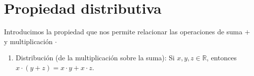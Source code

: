 \documentclass[11pt]{article}
\newcommand{\R}{\mathbb{R}}
\begin{document}
\section*{Propiedad distributiva}

Introducimos la propiedad que nos permite relacionar las operaciones de suma $+$ y multiplicación $\cdot$

\begin{enumerate}[start=11]%
 \item Distribución (de la multiplicación sobre la suma): Si $x,y,z\in \R$, entonces $x\cdot (y+z)=x\cdot y+ x\cdot z$.
\end{enumerate}
\end{document}
